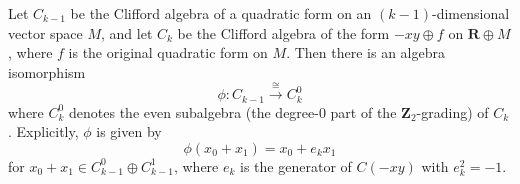 Let $C_{k-1}$ be the Clifford algebra of a quadratic form on an $(k-1)$-dimensional vector space $M$, and let $C_k$ be the Clifford algebra of the form $-xy \oplus f$ on $\mathbf{R} \oplus M$, where $f$ is the original quadratic form on $M$. Then there is an algebra isomorphism
$$
\phi: C_{k-1} \overset{\cong}{\longrightarrow} C_k^0
$$
where $C_k^0$ denotes the even subalgebra (the degree-0 part of the $\mathbf{Z}_2$-grading) of $C_k$. Explicitly, $\phi$ is given by
$$
\phi(x_0 + x_1) = x_0 + e_k x_1
$$
for $x_0 + x_1 \in C_{k-1}^0 \oplus C_{k-1}^1$, where $e_k$ is the generator of $C(-xy)$ with $e_k^2 = -1$.
